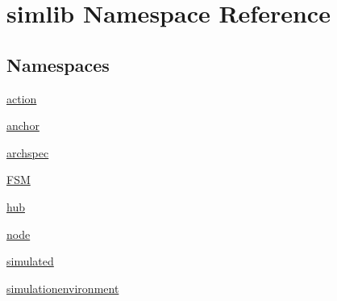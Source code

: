\hypertarget{namespacesimlib}{}\section{simlib Namespace Reference}
\label{namespacesimlib}
\subsection*{Namespaces}
\begin{DoxyCompactItemize}
\item 
 \mbox{\hyperlink{namespacesimlib_1_1action}{action}}
\item 
 \mbox{\hyperlink{namespacesimlib_1_1anchor}{anchor}}
\item 
 \mbox{\hyperlink{namespacesimlib_1_1archspec}{archspec}}
\item 
 \mbox{\hyperlink{namespacesimlib_1_1_f_s_m}{F\+SM}}
\item 
 \mbox{\hyperlink{namespacesimlib_1_1hub}{hub}}
\item 
 \mbox{\hyperlink{namespacesimlib_1_1node}{node}}
\item 
 \mbox{\hyperlink{namespacesimlib_1_1simulated}{simulated}}
\item 
 \mbox{\hyperlink{namespacesimlib_1_1simulationenvironment}{simulationenvironment}}
\end{DoxyCompactItemize}
